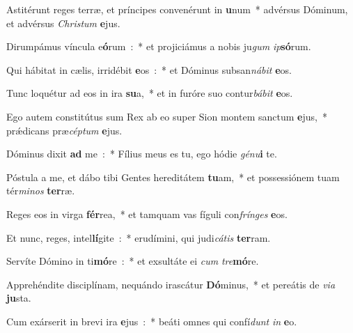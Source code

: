 ﻿\item Astitérunt reges terræ, et príncipes convenérunt in \textbf{u}num~* advérsus Dóminum, et advérsus \emph{Chri}\emph{stum} \textbf{e}jus.
\item Dirumpámus víncula e\textbf{ó}rum~:~* et projiciámus a nobis ju\emph{gum} \emph{ip}\textbf{só}rum.
\item Qui hábitat in cælis, irridébit \textbf{e}os~:~* et Dóminus subsan\emph{ná}\emph{bit} \textbf{e}os.
\item Tunc loquétur ad eos in ira \textbf{su}a,~* et in furóre suo contur\emph{bá}\emph{bit} \textbf{e}os.
\item Ego autem constitútus sum Rex ab eo super Sion montem sanctum \textbf{e}jus,~* prǽdicans præ\emph{cép}\emph{tum} \textbf{e}jus.
\item Dóminus dixit \textbf{ad} me~:~* Fílius meus es tu, ego hódie \emph{gé}\emph{nu}\textbf{i} te.
\item Póstula a me, et dábo tibi Gentes hereditátem \textbf{tu}am,~* et possessiónem tuam tér\emph{mi}\emph{nos} \textbf{ter}ræ.
\item Reges eos in virga \textbf{fér}rea,~* et tamquam vas fíguli con\emph{frín}\emph{ges} \textbf{e}os.
\item Et nunc, reges, intel\textbf{lí}gite~:~* erudímini, qui judi\emph{cá}\emph{tis} \textbf{ter}ram.
\item Servíte Dómino in ti\textbf{mó}re~:~* et exsultáte ei \emph{cum} \emph{tre}\textbf{mó}re.
\item Apprehéndite disciplínam, nequándo irascátur \textbf{Dó}minus,~* et pereátis de \emph{vi}\emph{a} \textbf{ju}sta.
\item Cum exárserit in brevi ira \textbf{e}jus~:~* beáti omnes qui confí\emph{dunt} \emph{in} \textbf{e}o.
